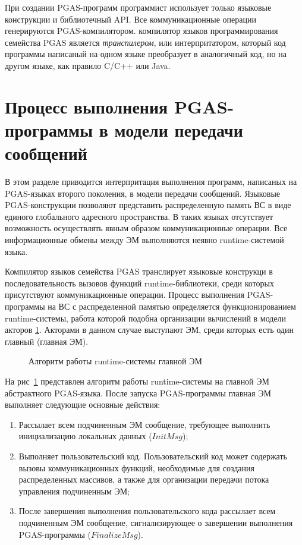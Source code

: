 При создании PGAS-программ программист использует только языковые конструкции и библиотечный API. Все коммуникационные операции генерируются PGAS-компилятором. компилятор языков программирования семейства PGAS является \textit{транспилером}, или интерпритатором, который код программы написаный на одном языке преобразует в аналогичный код, но на другом языке, как правило C/C++ или Java.

\section{Процесс выполнения PGAS-программы в модели передачи сообщений}

В этом разделе приводится интерпритация выполнения программ,
написаных на PGAS-языках второго поколения, в модели передачи сообщений.
Языковые PGAS-конструкции позволяют представить распределенную память ВС в виде
единого глобального адресного пространства. В таких языках отсутствует
возможность осуществлять явным образом коммуникационные операции. Все
информационные обмены между ЭМ выполняются неявно runtime-системой языка. 

Компилятор языков семейства PGAS транслирует языковые конструкци в
последовательность вызовов функций runtime-библиотеки, среди которых
присутствуют коммуникационные операции. Процесс выполнения PGAS-программы на ВС
с распределенной памятью определяется функционированием runtime-системы,
работа которой подобна организации вычислений в модели акторов \ref{}. Акторами
в данном случае выступают ЭМ, среди которых есть один главный (главная ЭМ).

\begin{figure}[!h]
	
    \caption{Алгоритм работы runtime-системы главной ЭМ}
    \label{list:runtime_master}
\end{figure}

На рис~\ref{list:runtime_master} представлен алгоритм работы runtime-системы
на главной ЭМ абстрактного PGAS-языка. После запуска PGAS-программы главная ЭМ
выполняет следующие основные действия:
\begin{enumerate}
\item Рассылает всем подчиненным ЭМ сообщение, требующее выполнить
  инициализацию локальных данных ($InitMsg$);
\item Выполняет пользовательский код. Пользовательский код может содержать
  вызовы коммуникационных функций, необходимые для создания распределенных
  массивов, а также для организации передачи потока управления подчиненным ЭМ;
\item После завершения выполнения пользовательского кода рассылает всем
  подчиненным ЭМ сообщение, сигнализирующее о завершении выполнения
  PGAS-программы ($FinalizeMsg$).
\end{enumerate}  

